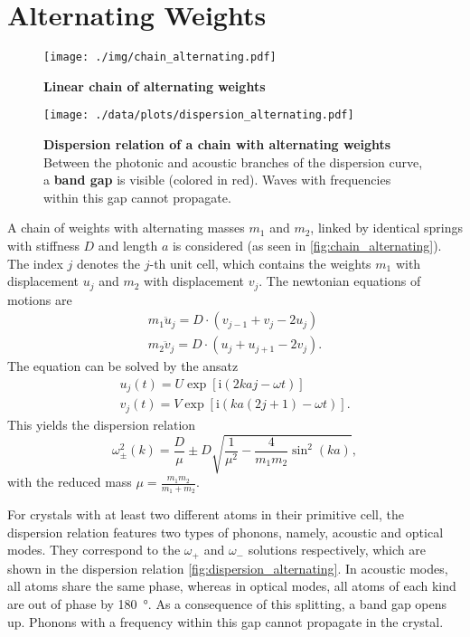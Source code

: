 \section{Alternating Weights}
\begin{figure}[tbp]
	\centering
	\texttt{[image: ./img/chain\_alternating.pdf]}
	\caption[Chain of Alternating Weights]{\textbf{Linear chain of alternating weights}}
	\label{fig:chain_alternating}
\end{figure}
\begin{figure}[tbp]
	\centering
	\texttt{[image: ./data/plots/dispersion\_alternating.pdf]}
	\caption[Dispersion Relation of Chain With Alternating Weights]{\textbf{Dispersion relation of a chain with alternating weights} Between the photonic and acoustic branches of the dispersion curve, a \textbf{band gap} is visible (colored in red). Waves with frequencies within this gap cannot propagate.}
	\label{fig:dispersion_alternating}
\end{figure}
A chain of weights with alternating masses $m_1$ and $m_2$, linked by identical springs with stiffness $D$ and length $a$ is considered (as seen in \autoref{fig:chain_alternating}).
The index $j$ denotes the $j$-th unit cell, which contains the weights $m_1$ with displacement $u_j$ and $m_2$ with displacement $v_j$.
The newtonian equations of motions are
\begin{gather*}
	m_1 \ddot u_j = D \cdot \left(v_{j - 1} + v_{j} - 2 u_j \right)\\
	m_2 \ddot v_j = D \cdot \left(u_{j} + u_{j + 1} - 2 v_j \right).
\end{gather*}
The equation can be solved by the ansatz
\begin{gather*}
	u_j(t) = U \exp\left[\text{i} \left(2 k a j - \omega t\right)\right]\\
	v_j(t) = V \exp\left[\text{i} \left(k a (2 j + 1) - \omega t\right)\right].
\end{gather*}
This yields the dispersion relation
\begin{equation}
	\omega_\pm^2(k) = \frac{D}{\mu} \pm D\sqrt{\frac{1}{\mu^2} - \frac{4}{m_1 m_2}\sin^2\left(k a\right)},
\end{equation}
with the reduced mass $\mu = \frac{m_1 m_2}{m_1 + m_2}$.

For crystals with at least two different atoms in their primitive cell, the dispersion relation features two types of phonons, namely, acoustic and optical modes.
They correspond to the $\omega_{+}$ and $\omega_{-}$ solutions respectively, which are shown in the dispersion relation \autoref{fig:dispersion_alternating}.
In acoustic modes, all atoms share the same phase, whereas in optical modes, all atoms of each kind are out of phase by \SI{180}{\degree}.
As a consequence of this splitting, a band gap opens up.
Phonons with a frequency within this gap cannot propagate in the crystal.
